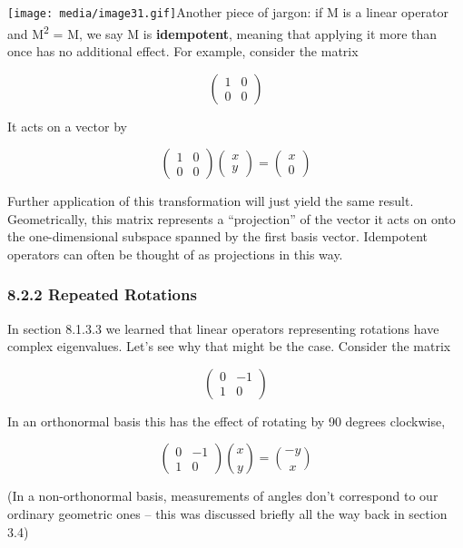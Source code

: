 \documentclass[oneside,english]{amsbook}
\numberwithin{section}{chapter}
\theoremstyle{plain}
\theoremstyle{definition}
\begin{document}
\texttt{[image: media/image31.gif]}Another
piece of jargon: if M is a linear operator and M\textsuperscript{2} = M,
we say M is \textbf{idempotent}, meaning that applying it more than once
has no additional effect. For example, consider the matrix

\[\begin{pmatrix}
	1 & 0 \\
	0 & 0
\end{pmatrix}\]

It acts on a vector by

\[\begin{pmatrix}
	1 & 0 \\
	0 & 0
\end{pmatrix}\begin{pmatrix}
	x \\
	y
\end{pmatrix} = \begin{pmatrix}
	x \\
	0
\end{pmatrix}\]

Further application of this transformation will just yield the same
result. Geometrically, this matrix represents a ``projection'' of the
vector it acts on onto the one-dimensional subspace spanned by the first
basis vector. Idempotent operators can often be thought of as
projections in this way.

\subsubsection{8.2.2 Repeated Rotations}\label{repeated-rotations}

In section 8.1.3.3 we learned that linear operators representing
rotations have complex eigenvalues. Let's see why that might be the
case. Consider the matrix

\[\begin{pmatrix}
	0 & - 1 \\
	1 & 0
\end{pmatrix}\]

In an orthonormal basis this has the effect of rotating by 90 degrees
clockwise,

\[\begin{pmatrix}
	0 & - 1 \\
	1 & 0
\end{pmatrix}\binom{x}{y} = \binom{- y}{x}\]

(In a non-orthonormal basis, measurements of angles don't correspond to
our ordinary geometric ones -- this was discussed briefly all the way
back in section 3.4)
\end{document}
